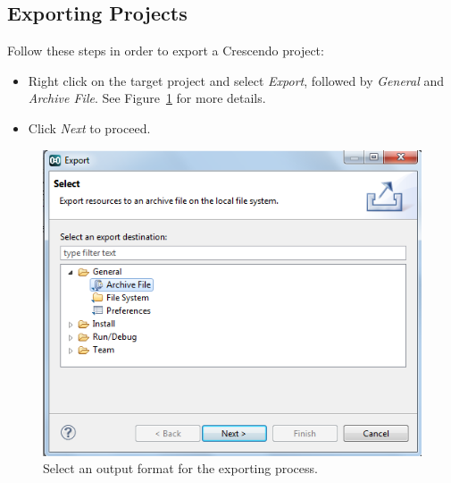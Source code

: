 \documentclass{crescendorepchap}
\begin{document}
\subsection{Exporting Projects}

Follow these steps in order to export a Crescendo project:

\begin{itemize}
\item
  Right click on the target project and select \emph{Export}, followed
  by \emph{General} and \emph{Archive File}. See Figure~\ref{fig:export}
  for more details.
\item
  Click \emph{Next} to proceed.
\end{itemize}


\begin{figure}[htbp]
\centering
\includegraphics[width=.6\textwidth]{images/DestecsExportDialog.png}
\caption{Select an output format for the exporting process.\label{fig:export}}
\end{figure}




\end{document}
